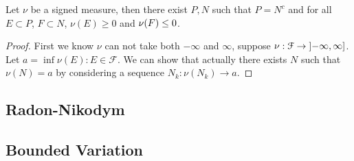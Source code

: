 \begin{thm}
    Let \(\nu\) be a signed measure, then there exist \(P,N\) such that \(P = N^{c}\) and for all \(E\subset P\), \(F\subset N\), \(\nu(E) \geq 0\) and \(\nu \pqty{F} \leq 0\). 
\end{thm}

\begin{proof}
    First we know \(\nu\) can not take both \(-\infty\) and \(\infty\), suppose \(\nu: \mathcal{F} \to \linterval{- \infty}{\infty}\). Let \(a = \inf \nu(E): E \in \mathcal{F}\). We can show that actually there exists \(N\) such that \(\nu(N) = a\) by considering a sequence \(N_{k}: \nu(N_{k})\to a\). 
\end{proof}



\subsection{Radon-Nikodym}

\subsection{Bounded Variation}


